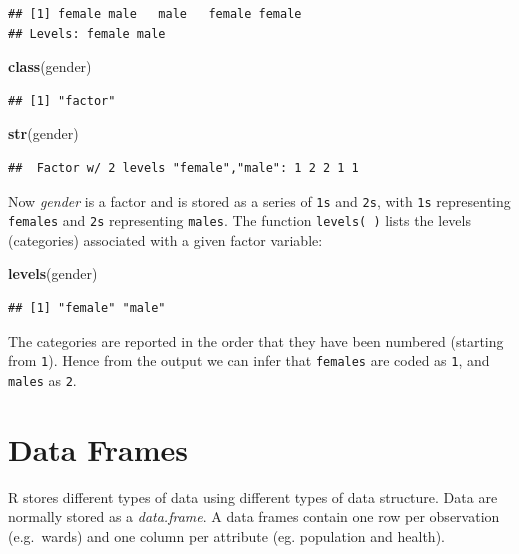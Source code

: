 \documentclass[
]{book}
\newenvironment{Shaded}{\begin{snugshade}}{\end{snugshade}}
\newcommand{\KeywordTok}[1]{\textcolor[rgb]{0.13,0.29,0.53}{\textbf{#1}}}
\newcommand{\NormalTok}[1]{#1}
\begin{document}
\begin{verbatim}
## [1] female male   male   female female
## Levels: female male
\end{verbatim}

\begin{Shaded}
\begin{Highlighting}[]
\KeywordTok{class}\NormalTok{(gender)}
\end{Highlighting}
\end{Shaded}

\begin{verbatim}
## [1] "factor"
\end{verbatim}

\begin{Shaded}
\begin{Highlighting}[]
\KeywordTok{str}\NormalTok{(gender)}
\end{Highlighting}
\end{Shaded}

\begin{verbatim}
##  Factor w/ 2 levels "female","male": 1 2 2 1 1
\end{verbatim}

Now \emph{gender} is a factor and is stored as a series of \texttt{1s} and \texttt{2s}, with \texttt{1s} representing \texttt{females} and \texttt{2s} representing \texttt{males}. The function \texttt{levels(\ )} lists the levels (categories) associated with a given factor variable:

\begin{Shaded}
\begin{Highlighting}[]
\KeywordTok{levels}\NormalTok{(gender)}
\end{Highlighting}
\end{Shaded}

\begin{verbatim}
## [1] "female" "male"
\end{verbatim}

The categories are reported in the order that they have been numbered (starting from \texttt{1}). Hence from the output we can infer that \texttt{females} are coded as \texttt{1}, and \texttt{males} as \texttt{2}.

\hypertarget{data-frames}{%
\section{Data Frames}\label{data-frames}}

R stores different types of data using different types of data structure. Data are normally stored as a \emph{data.frame}. A data frames contain one row per observation (e.g.~wards) and one column per attribute (eg. population and health).
\end{document}
